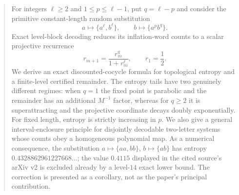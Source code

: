 \begin{abstract}
For integers $\ell\ge2$ and $1\le p\le\ell-1$, put $q=\ell-p$ and
consider the primitive constant-length random substitution
\[
 a\mapsto\{a^\ell,b^\ell\},\qquad b\mapsto\{a^pb^q\}.
\]
Exact level-block decoding reduces its inflation-word counts to a scalar
projective recurrence
\[
 r_{m+1}=\frac{r_m^q}{1+r_m^\ell},\qquad r_1=\frac12.
\]
We derive an exact discounted-cocycle formula for topological entropy and a
finite-level certified remainder.  The entropy tails have two genuinely
different regimes: when $q=1$ the fixed point is parabolic and the remainder
has an additional $M^{-1}$ factor, whereas for $q\ge2$ it is
superattracting and the projective coordinate decays doubly exponentially.
For fixed length, entropy is strictly increasing in $p$.  We also give a
general interval-enclosure principle for disjointly decodable two-letter
systems whose counts obey a homogeneous polynomial map.  As a numerical
consequence, the substitution $a\mapsto\{aa,bb\}$, $b\mapsto\{ab\}$ has
entropy $0.4328862961227668\ldots$; the value $0.4115$ displayed in the
cited source's arXiv v2 is excluded already by a level-$14$ exact lower bound.
The correction is presented as a corollary, not as the paper's principal
contribution.
\end{abstract}
